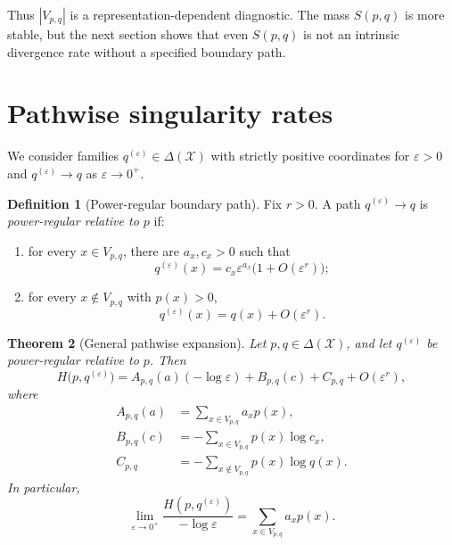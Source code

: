 \documentclass[11pt,a4paper]{article}
\newtheorem{theorem}{Theorem}[section]
\theoremstyle{definition}
\newtheorem{definition}[theorem]{Definition}
\theoremstyle{remark}
\newcommand{\simplex}{\Delta(\mathcal X)}
\begin{document}
Thus $|V_{p,q}|$ is a representation-dependent diagnostic.
The mass $S(p,q)$ is more stable, but the next section shows that even $S(p,q)$ is not an intrinsic divergence rate without a specified boundary path.

\section{Pathwise singularity rates}
\label{sec:pathwise}

We consider families $q^{(\varepsilon)}\in\simplex$ with strictly positive coordinates for $\varepsilon>0$ and $q^{(\varepsilon)}\to q$ as $\varepsilon\to0^+$.

\begin{definition}[Power-regular boundary path]
\label{def:path}
Fix $r>0$.
A path $q^{(\varepsilon)}\to q$ is \emph{power-regular relative to $p$} if:
\begin{enumerate}[label=(\roman*)]
  \item for every $x\in V_{p,q}$, there are $a_x,c_x>0$ such that
  \[
    q^{(\varepsilon)}(x)
      = c_x\varepsilon^{a_x}\bigl(1+O(\varepsilon^r)\bigr);
  \]
  \item for every $x\notin V_{p,q}$ with $p(x)>0$,
  \[
    q^{(\varepsilon)}(x)=q(x)+O(\varepsilon^r).
  \]
\end{enumerate}
\end{definition}

\begin{theorem}[General pathwise expansion]
\label{thm:pathwise}
Let $p,q\in\simplex$, and let $q^{(\varepsilon)}$ be power-regular relative to $p$.
Then
\begin{equation}
\boxed{
  H\bigl(p,q^{(\varepsilon)}\bigr)
  = A_{p,q}(a)(-\log\varepsilon)
    + B_{p,q}(c)
    + C_{p,q}
    + O(\varepsilon^r),
}
\label{eq:pathwise}
\end{equation}
where
\begin{align}
  A_{p,q}(a) &= \sum_{x\in V_{p,q}}a_xp(x), \\
  B_{p,q}(c) &= -\sum_{x\in V_{p,q}}p(x)\log c_x, \\
  C_{p,q} &= -\sum_{x\notin V_{p,q}}p(x)\log q(x).
\end{align}
In particular,
\begin{equation}
  \lim_{\varepsilon\to0^+}
  \frac{H(p,q^{(\varepsilon)})}{-\log\varepsilon}
  = \sum_{x\in V_{p,q}}a_xp(x).
  \label{eq:normalized-rate}
\end{equation}
\end{theorem}
\end{document}

